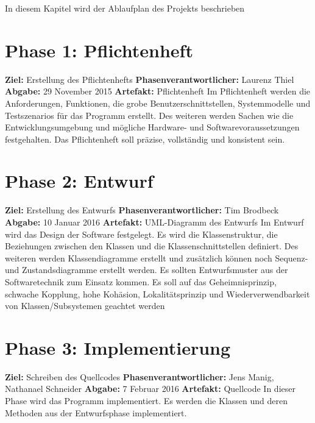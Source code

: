 In diesem Kapitel wird der Ablaufplan des Projekts beschrieben
\section{Phase 1: Pflichtenheft}
\textbf{Ziel:} Erstellung des Pflichtenhefts \newline
\textbf{Phasenverantwortlicher:} Laurenz Thiel \newline
\textbf{Abgabe:} 29 November 2015 \newline
\textbf{Artefakt:} Pflichtenheft \newline
Im Pflichtenheft werden die Anforderungen, Funktionen, die grobe Benutzerschnittstellen, Systemmodelle und Testszenarios für das Programm erstellt. Des weiteren werden Sachen wie die Entwicklungsumgebung und mögliche Hardware- und Softwarevoraussetzungen festgehalten. Das Pflichtenheft soll präzise, vollständig und konsistent sein.

\section{Phase 2: Entwurf}
\textbf{Ziel:} Erstellung des Entwurfs \newline
\textbf{Phasenverantwortlicher:} Tim Brodbeck \newline
\textbf{Abgabe:} 10 Januar 2016 \newline
\textbf{Artefakt:} UML-Diagramm des Entwurfs \newline
Im Entwurf wird das Design der Software festgelegt. Es wird die Klassenstruktur, die Beziehungen zwischen den Klassen und die Klassenschnittstellen definiert. Des weiteren werden Klassendiagramme erstellt und zusätzlich können noch Sequenz- und Zustandsdiagramme erstellt werden. Es sollten Entwurfsmuster aus der Softwaretechnik zum Einsatz kommen. Es soll auf das Geheimnisprinzip, schwache Kopplung, hohe Kohäsion, Lokalitätsprinzip und Wiederverwendbarkeit von Klassen/Subsystemen geachtet werden

\section{Phase 3: Implementierung}
\textbf{Ziel:} Schreiben des Quellcodes \newline
\textbf{Phasenverantwortlicher:} Jens Manig, Nathanael Schneider  \newline
\textbf{Abgabe:} 7 Februar 2016 \newline
\textbf{Artefakt:} Quellcode \newline
In dieser Phase wird das Programm implementiert. Es werden die Klassen und deren Methoden aus der Entwurfsphase implementiert.


